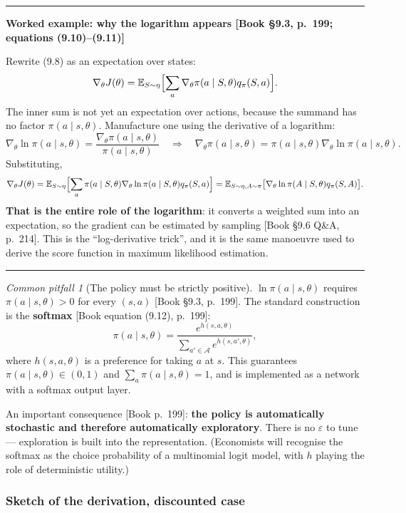 \documentclass[11pt, letterpaper]{article}
\theoremstyle{runin}
\theoremstyle{runinplain}
\theoremstyle{remark}
\newtheorem*{warning}{Common pitfall}
\newcommand{\E}{\mathbb{E}}
\newcommand{\Aspace}{\mathcal{A}}
\newcommand{\bkin}[1]{{\color{bookblue}\small[\textsf{Book #1}]}}
\newenvironment{worked}[1]
  {\par\medskip\noindent\rule{\textwidth}{0.4pt}\par\nobreak\vspace{0.3em}
   \noindent\textbf{Worked example: #1}\par\nobreak\vspace{0.2em}\small}
  {\par\nobreak\vspace{0.3em}\noindent\rule{\textwidth}{0.4pt}\par\medskip}
\begin{document}
\begin{worked}{why the logarithm appears \bkin{\S9.3, p.~199; equations (9.10)--(9.11)}}
Rewrite (9.8) as an expectation over states:
\[
  \nabla_\theta J(\theta)=\E_{S\sim\eta}\Bigl[\sum_a\nabla_\theta\pi(a\mid S,\theta)q_\pi(S,a)\Bigr].
\]
The inner sum is not yet an expectation over actions, because the summand has no
factor $\pi(a\mid s,\theta)$. Manufacture one using the derivative of a logarithm:
\[
  \nabla_\theta\ln\pi(a\mid s,\theta)=\frac{\nabla_\theta\pi(a\mid s,\theta)}{\pi(a\mid s,\theta)}
  \quad\Longrightarrow\quad
  \nabla_\theta\pi(a\mid s,\theta)=\pi(a\mid s,\theta)\nabla_\theta\ln\pi(a\mid s,\theta).
\]
Substituting,
\[
  \nabla_\theta J(\theta)
  =\E_{S\sim\eta}\Bigl[\sum_a\pi(a\mid S,\theta)\nabla_\theta\ln\pi(a\mid S,\theta)q_\pi(S,a)\Bigr]
  =\E_{S\sim\eta,A\sim\pi}\bigl[\nabla_\theta\ln\pi(A\mid S,\theta)q_\pi(S,A)\bigr].
\]
\textbf{That is the entire role of the logarithm}: it converts a weighted sum into
an expectation, so the gradient can be estimated by sampling
\bkin{\S9.6 Q\&A, p.~214}. This is the ``log-derivative trick'', and it is the same
manoeuvre used to derive the score function in maximum likelihood estimation.
\end{worked}

\begin{warning}[The policy must be strictly positive]
$\ln\pi(a\mid s,\theta)$ requires $\pi(a\mid s,\theta)>0$ for every $(s,a)$
\bkin{\S9.3, p.~199}. The standard construction is the \textbf{softmax}
\bkin{equation (9.12), p.~199}:
\[
  \pi(a\mid s,\theta)=\frac{e^{h(s,a,\theta)}}{\sum_{a'\in\Aspace}e^{h(s,a',\theta)}},
\]
where $h(s,a,\theta)$ is a preference for taking $a$ at $s$. This guarantees
$\pi(a\mid s,\theta)\in(0,1)$ and $\sum_a\pi(a\mid s,\theta)=1$, and is implemented
as a network with a softmax output layer.

An important consequence \bkin{p.~199}: \textbf{the policy is automatically
stochastic and therefore automatically exploratory}. There is no $\varepsilon$ to
tune --- exploration is built into the representation. (Economists will recognise the
softmax as the choice probability of a multinomial logit model, with $h$ playing the
role of deterministic utility.)
\end{warning}

\subsubsection{Sketch of the derivation, discounted case}
\end{document}
